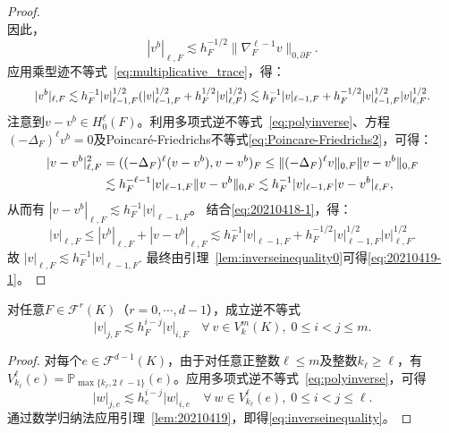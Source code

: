 \begin{proof}
$$$$
因此，
\begin{equation}\label{eq:20210527-3}
|v^b|_{\ell,F}\lesssim h_F^{-1/2}\|\nabla_F^{\ell-1}v\|_{0,\partial F}.  
\end{equation}
应用乘型迹不等式~\eqref{eq:multiplicative_trace}，得：
\begin{equation}\label{eq:20210418-1}
\resizebox{0.915\textwidth}{!}{$\displaystyle
|v^b|_{\ell,F}\lesssim h_F^{-1}|v|_{\ell-1, F}^{1/2}(|v|_{\ell-1,F}^{1/2}+h_F^{1/2}|v|_{\ell,F}^{1/2}) \lesssim h_F^{-1}|v|_{\ell-1,F} + h_F^{-1/2}|v|_{\ell-1,F}^{1/2}|v|_{\ell,F}^{1/2}. 
$}
\end{equation}
注意到$v-v^b\in H_0^{\ell}(F)$。利用多项式逆不等式~\eqref{eq:polyinverse}、方程$(-\Delta_F)^{\ell}v^b=0$及Poincaré-Friedrichs不等式\eqref{eq:Poincare-Friedrichs2}，可得：
\begin{align}
|v-v^b|_{\ell,F}^2&=((-\Delta_F)^{\ell}(v-v^b), v-v^b)_F\leq \|(-\Delta_F)^{\ell}v\|_{0,F}\|v-v^b\|_{0,F} \label{eq:20210421-1}\\
&\lesssim h_F^{-\ell-1}|v|_{\ell-1,F}\|v-v^b\|_{0,F} \lesssim h_F^{-1}|v|_{\ell-1,F}|v-v^b|_{\ell,F},  \notag
\end{align}
从而有
$|v-v^b|_{\ell,F}\lesssim h_F^{-1}|v|_{\ell-1,F}$。
结合\eqref{eq:20210418-1}，得：
$$
|v|_{\ell,F}\leq |v^b|_{\ell,F}+|v-v^b|_{\ell,F}\lesssim h_F^{-1}|v|_{\ell-1,F} + h_F^{-1/2}|v|_{\ell-1,F}^{1/2}|v|_{\ell,F}^{1/2}.
$$
故
$
|v|_{\ell,F}\lesssim h_F^{-1}|v|_{\ell-1,F}.
$
最终由引理~\ref{lem:inverseinequality0}可得\eqref{eq:20210419-1}。
\end{proof}

\begin{lemma}[逆不等式]
对任意$F\in\mathcal F^r(K)$（$r=0,\cdots, d-1$），成立逆不等式
\begin{equation}\label{eq:inverseinequality}
|v|_{j,F}\lesssim h_F^{i-j}|v|_{i,F}\quad \forall~v\in V_k^m(K),\; 0\leq i< j\leq m.
\end{equation}
\end{lemma}
\begin{proof}
对每个$e\in \mathcal F^{d-1}(K)$，由于对任意正整数$\ell\leq
m$及整数$k_{\ell}\geq\ell$，有$V_{k_{\ell}}^{\ell}(e)=\mathbb P_{\max\{k_{\ell},
2\ell-1\}}(e)$。应用多项式逆不等式~\eqref{eq:polyinverse}，可得
\begin{equation*}
|w|_{j,e}\lesssim h_e^{i-j}|w|_{i,e}\quad \forall~w\in V_{k_{\ell}}^{\ell}(e),\; 0\leq i< j\leq \ell.
\end{equation*}
通过数学归纳法应用引理~\ref{lem:20210419}，即得\eqref{eq:inverseinequality}。
\end{proof}

